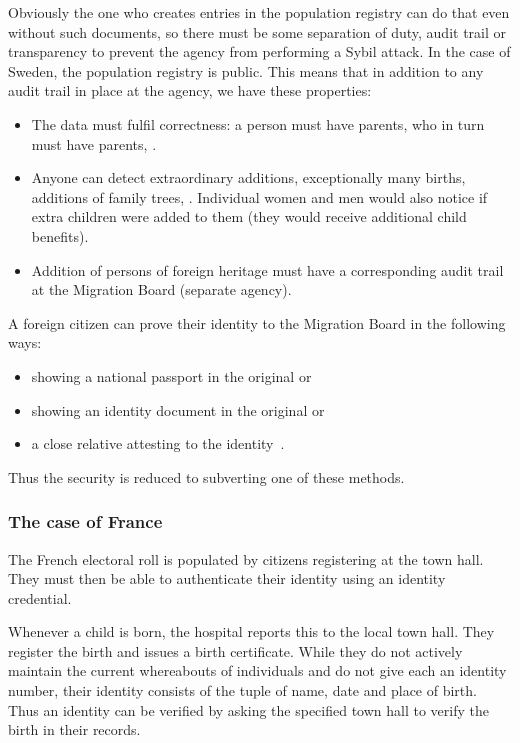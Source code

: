 Obviously the one who creates entries in the population registry can do that 
even without such documents, so there must be some separation of duty, audit 
trail or transparency to prevent the agency from performing a Sybil attack.
In the case of Sweden, the population registry is public.
This means that in addition to any audit trail in place at the agency, we have 
these properties:
\begin{itemize}
  \item The data must fulfil correctness: a person must have parents, who in 
    turn must have parents, \etc.
  \item Anyone can detect extraordinary additions, \eg exceptionally many 
    births, additions of family trees, \etc.
    Individual women and men would also notice if extra children were added to 
    them (they would receive additional child benefits).
  \item Addition of persons of foreign heritage must have a corresponding audit 
    trail at the Migration Board (separate agency).
\end{itemize}
A foreign citizen can prove their identity to the Migration Board in the 
following ways:
\begin{itemize}
  \item showing a national passport in the original or
  \item showing an identity document in the original or
  \item a close relative attesting to the 
    identity~\cite{Migrationsverket-ProvenIdentity}.
\end{itemize}
Thus the security is reduced to subverting one of these methods.

\subsubsection{The case of France}

The French electoral roll is populated by citizens registering at the town 
hall.
They must then be able to authenticate their identity using an identity 
credential.

Whenever a child is born, the hospital reports this to the local town hall.
They register the birth and issues a birth certificate.
While they do not actively maintain the current whereabouts of individuals and 
do not give each an identity number, their identity consists of the tuple of 
name, date and place of birth.
Thus an identity can be verified by asking the specified town hall to verify 
the birth in their records.

